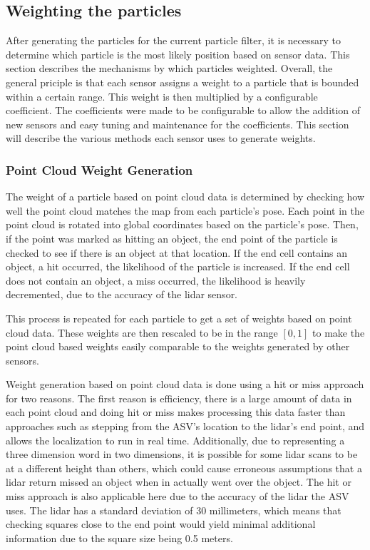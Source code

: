 \documentclass[10pt]{IEEEtran}
\begin{document}
\subsection{Weighting the particles}
After generating the particles for the current particle filter, it is necessary to determine
which particle is the most likely position based on sensor data.  This section describes 
the mechanisms by which particles weighted. Overall, the general priciple is that each sensor
assigns a weight to a particle that is bounded within a certain range.  This weight is then
multiplied by a configurable coefficient.  The coefficients were made to be configurable 
to allow the addition of new sensors and easy tuning and maintenance for the coefficients.
This section will describe the various methods each sensor uses to generate weights.

\subsubsection{Point Cloud Weight Generation}
The weight of a particle based on point cloud data is determined by checking how well the
point cloud matches the map from each particle's pose.  Each point in the point cloud is 
rotated into global coordinates based on the particle's pose.  Then, if the point was marked
as hitting an object, the end point of the
particle is checked to see if there is an object at that location.  If the end cell 
contains an object, a hit occurred, the likelihood of the particle is increased.  If the end
cell does not contain an object, a miss occurred, the likelihood is heavily decremented, due to the accuracy
of the lidar sensor.

This process is repeated for each particle to get a set of weights based on point cloud data.
These weights are then rescaled to be in the range \([0,1]\) 
to make the point cloud based weights easily comparable to the weights 
generated by other sensors.

Weight generation based on point cloud data is done using a hit or miss approach for two
reasons.  The first reason is efficiency, there is a large amount of data in each point cloud
and doing hit or miss makes processing this data faster than approaches such as stepping
from the ASV's location to the lidar's end point, and allows the localization to run in real
time. Additionally, due to representing a three dimension word in two dimensions, it is 
possible for some lidar scans to be at a different height than others, which could cause
erroneous assumptions that a lidar return missed an object when in actually went over
the object.  The hit or miss approach is also applicable here due to the accuracy
of the lidar the 
ASV uses.  The lidar has a standard deviation of 30 millimeters, which means that checking
squares close to the end point would yield minimal additional information due to the square
size being 0.5 meters.
\end{document}
